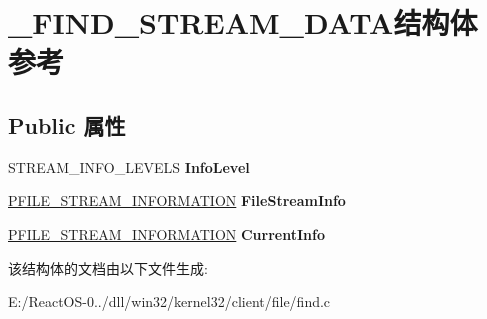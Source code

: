 \hypertarget{struct___f_i_n_d___s_t_r_e_a_m___d_a_t_a}{}\section{\+\_\+\+F\+I\+N\+D\+\_\+\+S\+T\+R\+E\+A\+M\+\_\+\+D\+A\+T\+A结构体 参考}
\label{struct___f_i_n_d___s_t_r_e_a_m___d_a_t_a}
\subsection*{Public 属性}
\begin{DoxyCompactItemize}
\item 
\mbox{\label{struct___f_i_n_d___s_t_r_e_a_m___d_a_t_a_ae5737a65cbfbdd60e9ce0e485dfed7af}} 
S\+T\+R\+E\+A\+M\+\_\+\+I\+N\+F\+O\+\_\+\+L\+E\+V\+E\+LS {\bfseries Info\+Level}
\item 
\mbox{\label{struct___f_i_n_d___s_t_r_e_a_m___d_a_t_a_a3be60b1961e64a7a3c4eae1d1086d5cb}} 
\hyperlink{struct___f_i_l_e___s_t_r_e_a_m___i_n_f_o_r_m_a_t_i_o_n}{P\+F\+I\+L\+E\+\_\+\+S\+T\+R\+E\+A\+M\+\_\+\+I\+N\+F\+O\+R\+M\+A\+T\+I\+ON} {\bfseries File\+Stream\+Info}
\item 
\mbox{\label{struct___f_i_n_d___s_t_r_e_a_m___d_a_t_a_ab0db2b6d5db27fdfcbd22f2ea10bdff1}} 
\hyperlink{struct___f_i_l_e___s_t_r_e_a_m___i_n_f_o_r_m_a_t_i_o_n}{P\+F\+I\+L\+E\+\_\+\+S\+T\+R\+E\+A\+M\+\_\+\+I\+N\+F\+O\+R\+M\+A\+T\+I\+ON} {\bfseries Current\+Info}
\end{DoxyCompactItemize}


该结构体的文档由以下文件生成\+:\begin{DoxyCompactItemize}
\item 
E\+:/\+React\+O\+S-\/0../dll/win32/kernel32/client/file/find.\+c\end{DoxyCompactItemize}
